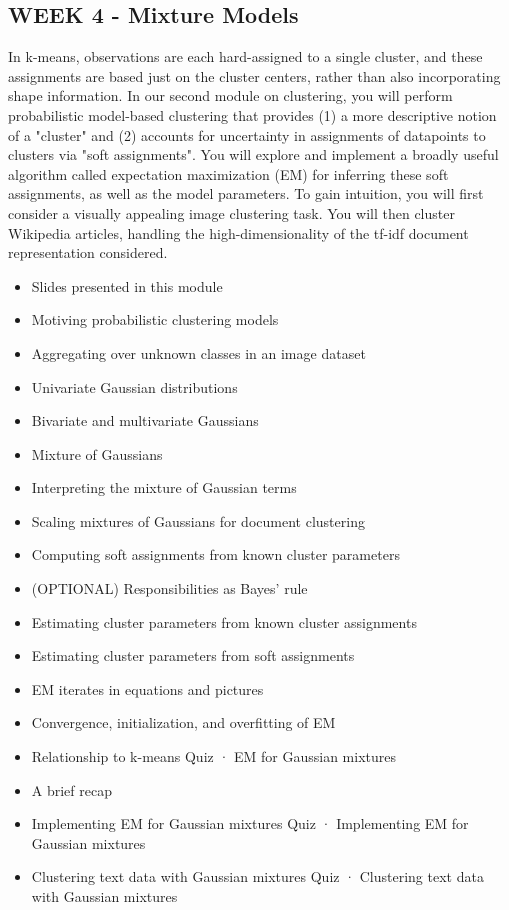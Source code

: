 \subsection{ WEEK 4 - Mixture Models}
In k-means, observations are each hard-assigned to a single cluster, and these assignments are based just on the cluster centers, rather than also incorporating shape information. In our second module on clustering, you will perform probabilistic model-based clustering that provides (1) a more descriptive notion of a "cluster" and (2) accounts for uncertainty in assignments of datapoints to clusters via "soft assignments". You will explore and implement a broadly useful algorithm called expectation maximization (EM) for inferring these soft assignments, as well as the model parameters. To gain intuition, you will first consider a visually appealing image clustering task. You will then cluster Wikipedia articles, handling the high-dimensionality of the tf-idf document representation considered.
\begin{itemize}
\item Slides presented in this module
\item Motiving probabilistic clustering models
\item Aggregating over unknown classes in an image dataset
\item Univariate Gaussian distributions
\item Bivariate and multivariate Gaussians
\item Mixture of Gaussians
\item Interpreting the mixture of Gaussian terms
\item Scaling mixtures of Gaussians for document clustering
\item Computing soft assignments from known cluster parameters
\item (OPTIONAL) Responsibilities as Bayes' rule
\item Estimating cluster parameters from known cluster assignments
\item Estimating cluster parameters from soft assignments
\item EM iterates in equations and pictures
\item Convergence, initialization, and overfitting of EM
\item Relationship to k-means
Quiz · EM for Gaussian mixtures
\item A brief recap
\item Implementing EM for Gaussian mixtures
Quiz · Implementing EM for Gaussian mixtures
\item Clustering text data with Gaussian mixtures
Quiz · Clustering text data with Gaussian mixtures
\end{itemize}
